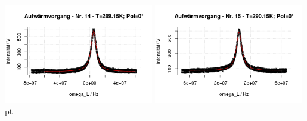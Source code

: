 \documentclass[12pt]{article}
\begin{document}
\begin{minipage}[h!]{\textwidth}
{	\includegraphics[width=0.49\textwidth]{figures/warm0-14.png}\vskip -10pt}	\includegraphics[width=0.49\textwidth]{figures/warm0-15.png} pt
\end{minipage}
\end{document}

